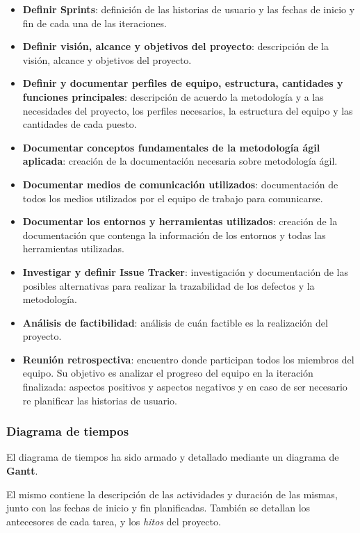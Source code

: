 \begin{itemize}
    \item{\textbf{Definir Sprints}:}
    definición de las historias de usuario y las fechas de inicio y fin de cada una de las iteraciones.
    \item{\textbf{Definir visión, alcance y objetivos del proyecto}:}
    descripción de la visión, alcance y objetivos del proyecto.
    \item{\textbf{Definir y documentar perfiles de equipo, estructura, cantidades y funciones principales}:}
    descripción de acuerdo la metodología y a las necesidades del proyecto, los perfiles necesarios, la estructura del equipo y las cantidades de cada puesto.
    \item{\textbf{Documentar conceptos fundamentales de la metodología ágil aplicada}:}
    creación de la documentación necesaria sobre metodología ágil.
    \item{\textbf{Documentar medios de comunicación utilizados}:}
    documentación de todos los medios utilizados por el equipo de trabajo para comunicarse.
    \item{\textbf{Documentar los entornos y herramientas utilizados}:}
    creación de la documentación que contenga la información de los entornos y todas las herramientas utilizadas.
    \item{\textbf{Investigar y definir Issue Tracker}:}
    investigación y documentación de las posibles alternativas para realizar la trazabilidad de los defectos y la metodología.
    \item{\textbf{Análisis de factibilidad}:}
    análisis de cuán factible es la realización del proyecto.
    \item{\textbf{Reunión retrospectiva}:}
    encuentro donde participan todos los miembros del equipo.
    Su objetivo es analizar el progreso del equipo en la iteración finalizada: aspectos positivos y aspectos negativos y en caso de ser necesario re planificar las historias de usuario.
    
    
    
\end{itemize}



\subsubsection{Diagrama de tiempos}

El diagrama de tiempos ha sido armado y detallado mediante un diagrama de \textbf{Gantt}.

El mismo contiene la descripción de las actividades y duración de las mismas, junto con las fechas de inicio y fin planificadas. También se detallan los antecesores de cada tarea, y los \textit{hitos} del proyecto.

